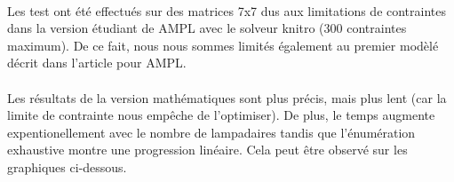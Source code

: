  \paragraph{} Les test ont été effectués sur des matrices 7x7 dus aux limitations de contraintes dans la version étudiant de AMPL avec le solveur knitro (300 contraintes maximum).  De ce fait, nous nous sommes limités également au premier modèlé décrit dans l'article pour AMPL.

\paragraph{} Les résultats de la version mathématiques sont plus précis, mais plus lent (car la limite de contrainte nous empêche de l'optimiser). De plus, le temps augmente expentionellement avec le nombre de lampadaires tandis que l'énumération exhaustive montre une progression linéaire. Cela peut être observé sur les graphiques ci-dessous.


